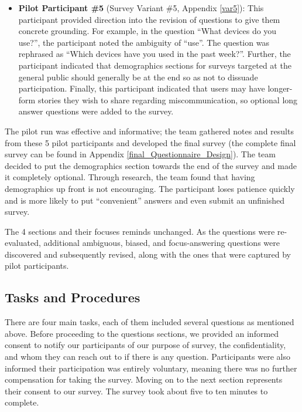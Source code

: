 \documentclass[acmsmall,screen,authorversion,nonacm]{acmart}
\begin{document}
\begin{itemize}
    \item \textbf{Pilot Participant \#5} (Survey Variant \#5, Appendix \ref{var5}): This participant provided direction into the revision of questions to give them concrete grounding. For example, in the question ``What devices do you use?'', the participant noted the ambiguity of ``use''. The question was rephrased as ``Which devices have you used in the past week?''. Further, the participant indicated that demographics sections for surveys targeted at the general public should generally be at the end so as not to dissuade participation. Finally, this participant indicated that users may have longer-form stories they wish to share regarding miscommunication, so optional long answer questions were added to the survey. %
\end{itemize}

The pilot run was effective and informative; the team gathered notes and results from these 5 pilot participants and developed the final survey (the complete final survey can be found in Appendix \ref{final_Questionnaire_Design}). The team decided to put the demographics section towards the end of the survey and made it completely optional. Through research, the team found that having demographics up front is not encouraging. The participant loses patience quickly and is more likely to put ``convenient'' answers and even submit an unfinished survey. 

The 4 sections and their focuses reminds unchanged. As the questions were re-evaluated, additional ambiguous, biased, and focus-answering questions were discovered and subsequently revised, along with the ones that were captured by pilot participants. 


\subsection{Tasks and Procedures}

There are four main tasks, each of them included several questions as mentioned above. Before proceeding to the questions sections, we provided an informed consent to notify our participants of our purpose of survey, the confidentiality, and whom they can reach out to if there is any question. Participants were also informed their participation was entirely voluntary, meaning there was no further compensation for taking the survey. Moving on to the next section represents their consent to our survey. The survey took about five to ten minutes to complete.
\end{document}
